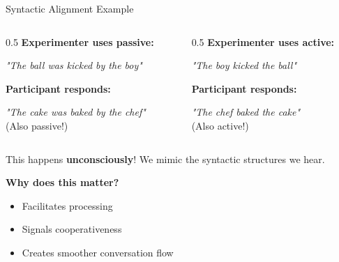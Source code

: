 \documentclass[aspectratio=169]{beamer}
\begin{document}
\begin{frame}{Syntactic Alignment Example 🔄}
    \begin{columns}[T]
        \begin{column}{0.5\textwidth}
            \textbf{Experimenter uses passive:}

            \vspace{0.15cm}

            \textit{"The ball was kicked by the boy"}

            \vspace{0.15cm}

            \textbf{Participant responds:}

            \vspace{0.15cm}

            \textit{"The cake was baked by the chef"} \\
            (Also passive!)
        \end{column}

        \begin{column}{0.5\textwidth}
            \textbf{Experimenter uses active:}

            \vspace{0.15cm}

            \textit{"The boy kicked the ball"}

            \vspace{0.15cm}

            \textbf{Participant responds:}

            \vspace{0.15cm}

            \textit{"The chef baked the cake"} \\
            (Also active!)
        \end{column}
    \end{columns}

    \vspace{0.3cm}

    \begin{thinkaboutit}
        This happens \textbf{unconsciously}! We mimic the syntactic structures we hear.
    \end{thinkaboutit}

    \vspace{0.3cm}

    \textbf{Why does this matter?}
    \begin{itemize}\setlength{\itemsep}{0pt}
        \item Facilitates processing
        \item Signals cooperativeness
        \item Creates smoother conversation flow
    \end{itemize}
\end{frame}
\end{document}

